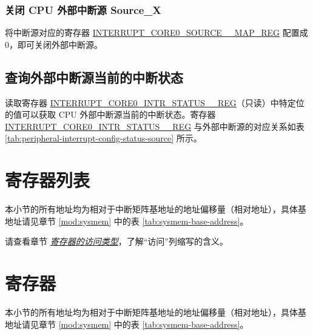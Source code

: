 \documentclass[main\_\_CN.tex]{subfiles}
\begin{document}
\subsubsection{关闭 CPU 外部中断源 Source\_X}

将中断源对应的寄存器 \hyperref[regdesc:INTERRUPTCORE0PIFPMSMONITORVIOLATESIZEINTRMAPREG]{INTERRUPT\_CORE0\_SOURCE\_\_MAP\_REG} 配置成 0，即可关闭外部中断源。

\subsection{查询外部中断源当前的中断状态}

读取寄存器 \hyperref[regdesc:INTERRUPTCORE0INTRSTATUS0REG]{INTERRUPT\_CORE0\_INTR\_STATUS\_\_REG}（只读）中特定位的值可以获取 CPU 外部中断源当前的中断状态。寄存器 \hyperref[regdesc:INTERRUPTCORE0INTRSTATUS0REG]{INTERRUPT\_CORE0\_INTR\_STATUS\_\_REG} 与外部中断源的对应关系如表 \ref{tab:peripheral-interrupt-config-status-source} 所示。

\begin{landscape}


\hypertarget{intmtrx-reg-summ}{}
\section{寄存器列表}
\label{sec:intmtrx-reg-summ}

本小节的所有地址均为相对于中断矩阵基地址的地址偏移量（相对地址），具体基地址请见章节 \ref{mod:sysmem} \textit{} 中的表 \ref{tab:sysmem-base-address}。

请查看章节 \hyperref[glossary-access-types]{\textit{寄存器的访问类型}}，了解“访问”列缩写的含义。


\end{landscape}


\clearpage
\section{寄存器}

本小节的所有地址均为相对于中断矩阵基地址的地址偏移量（相对地址），具体基地址请见章节 \ref{mod:sysmem} \textit{} 中的表 \ref{tab:sysmem-base-address}。


\end{document}
